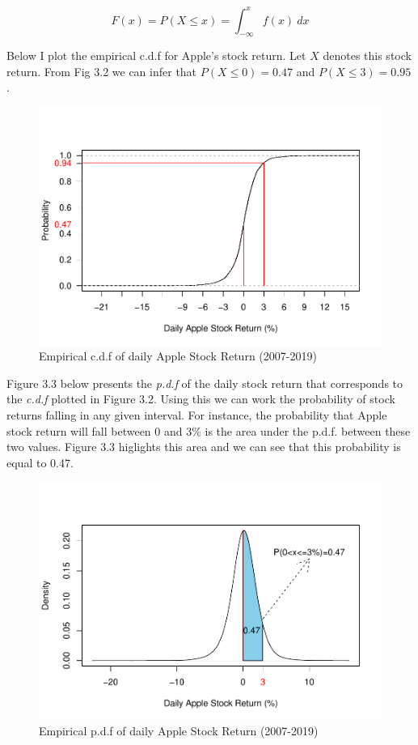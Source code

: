 \documentclass[]{book}
\theoremstyle{definition}
\theoremstyle{definition}
\theoremstyle{definition}
\theoremstyle{remark}
\begin{document}
\[F(x)=P(X\leq x)=\int_{-\infty}^xf(x) \ dx\]

Below I plot the empirical c.d.f for Apple's stock return. Let \(X\) denotes this stock return. From Fig 3.2 we can infer that \(P(X\leq 0)=0.47\) and \(P(X\leq 3)=0.95\).

\begin{figure}
\centering
\includegraphics{bookdown-demo_files/figure-latex/unnamed-chunk-44-1.pdf}
\caption{\label{fig:unnamed-chunk-44}Empirical c.d.f of daily Apple Stock Return (2007-2019)}
\end{figure}

Figure 3.3 below presents the \emph{p.d.f} of the daily stock return that corresponds to the \emph{c.d.f} plotted in Figure 3.2. Using this we can work the probability of stock returns falling in any given interval. For instance, the probability that Apple stock return will fall between 0 and 3\% is the area under the p.d.f. between these two values. Figure 3.3 higlights this area and we can see that this probability is equal to 0.47.

\begin{figure}
\centering
\includegraphics{bookdown-demo_files/figure-latex/unnamed-chunk-45-1.pdf}
\caption{\label{fig:unnamed-chunk-45}Empirical p.d.f of daily Apple Stock Return (2007-2019)}
\end{figure}
\end{document}
